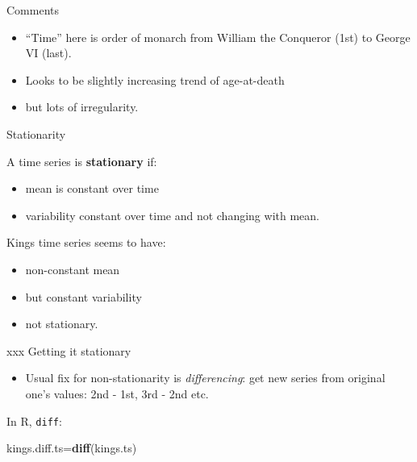 \documentclass[ignorenonframetext,]{beamer}
\newenvironment{Shaded}{\begin{snugshade}}{\end{snugshade}}
\newcommand{\KeywordTok}[1]{\textcolor[rgb]{0.13,0.29,0.53}{\textbf{#1}}}
\newcommand{\NormalTok}[1]{#1}
\providecommand{\tightlist}{%
  \setlength{\itemsep}{0pt}\setlength{\parskip}{0pt}}
\begin{document}
\begin{frame}{Comments}
\protect\hypertarget{comments-1}{}

\begin{itemize}
\item
  ``Time'' here is order of monarch from William the Conqueror (1st) to
  George VI (last).
\item
  Looks to be slightly increasing trend of age-at-death
\item
  but lots of irregularity.
\end{itemize}

\end{frame}

\begin{frame}{Stationarity}
\protect\hypertarget{stationarity}{}

A time series is \textbf{stationary} if:

\begin{itemize}
\tightlist
\item
  mean is constant over time
\item
  variability constant over time and not changing with mean.
\end{itemize}

Kings time series seems to have:

\begin{itemize}
\tightlist
\item
  non-constant mean
\item
  but constant variability
\item
  not stationary.
\end{itemize}

\end{frame}

\begin{frame}[fragile]{xxx Getting it stationary}
\protect\hypertarget{xxx-getting-it-stationary}{}

\begin{itemize}
\tightlist
\item
  Usual fix for non-stationarity is \emph{differencing}: get new series
  from original one's values: 2nd - 1st, 3rd - 2nd etc.
\end{itemize}

In R, \texttt{diff}:

\begin{Shaded}
\begin{Highlighting}[]
\NormalTok{kings.diff.ts=}\KeywordTok{diff}\NormalTok{(kings.ts)}
\end{Highlighting}
\end{Shaded}

\end{frame}
\end{document}
